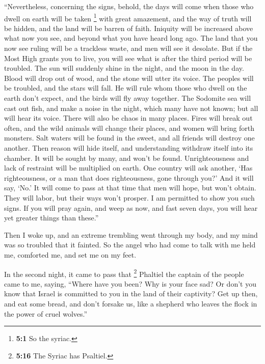  ``Nevertheless, concerning the signs, behold, the days
will come when those who dwell on earth will be taken \footnote{\textbf{5:1}
  So the syriac.} with great amazement, and the way of truth will be
hidden, and the land will be barren of faith.  Iniquity
will be increased above what now you see, and beyond what you have heard
long ago.  The land that you now see ruling will be a
trackless waste, and men will see it desolate.  But if the
Most High grants you to live, you will see what is after the third
period will be troubled. The sun will suddenly shine in the night, and
the moon in the day.  Blood will drop out of wood, and the
stone will utter its voice. The peoples will be troubled, and the stars
will fall.  He will rule whom those who dwell on the earth
don't expect, and the birds will fly away together.  The
Sodomite sea will cast out fish, and make a noise in the night, which
many have not known; but all will hear its voice.  There
will also be chaos in many places. Fires will break out often, and the
wild animals will change their places, and women will bring forth
monsters.  Salt waters will be found in the sweet, and all
friends will destroy one another. Then reason will hide itself, and
understanding withdraw itself into its chamber.  It will
be sought by many, and won't be found. Unrighteousness and lack of
restraint will be multiplied on earth.  One country will
ask another, `Has righteousness, or a man that does righteousness, gone
through you?' And it will say, `No.'  It will come to
pass at that time that men will hope, but won't obtain. They will labor,
but their ways won't prosper.  I am permitted to show you
such signs. If you will pray again, and weep as now, and fast seven
days, you will hear yet greater things than these.''

 Then I woke up, and an extreme trembling went through my
body, and my mind was so troubled that it fainted.  So
the angel who had come to talk with me held me, comforted me, and set me
on my feet.

 In the second night, it came to pass that \footnote{\textbf{5:16}
  The Syriac has Psaltiel.} Phaltiel the captain of the people came to
me, saying, ``Where have you been? Why is your face sad? 
Or don't you know that Israel is committed to you in the land of their
captivity?  Get up then, and eat some bread, and don't
forsake us, like a shepherd who leaves the flock in the power of cruel
wolves.''

